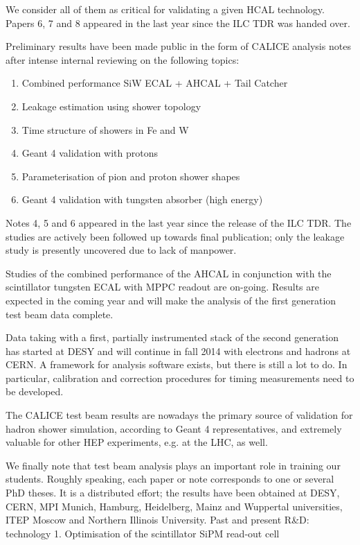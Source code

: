 We consider all of them as critical for validating a given HCAL technology. Papers 6, 7 and 8 appeared in the last year since the ILC TDR was handed over.

Preliminary results have been made public in the form of CALICE analysis notes after intense internal reviewing on the following topics:
\begin{enumerate}
\item Combined performance SiW ECAL + AHCAL + Tail Catcher
\item Leakage estimation using shower topology
\item Time structure of showers in Fe and W
\item Geant 4 validation with protons
\item Parameterisation of pion and proton shower shapes
\item Geant 4 validation with tungsten absorber (high energy)
\end{enumerate}

Notes 4, 5 and 6 appeared in the last year since the release of the ILC TDR. The studies are actively been followed up towards final publication; only the leakage study is presently uncovered due to lack of manpower.

Studies of the combined performance of the AHCAL in conjunction with the scintillator tungsten ECAL with MPPC readout are on-going. Results are expected in the coming year and will make the analysis of the first generation test beam data complete.

Data taking with a first, partially instrumented stack of the second generation has started at DESY and will continue in fall 2014 with electrons and hadrons at CERN. A framework for analysis software exists, but there is still a lot to do. In particular, calibration and correction procedures for timing measurements need to be developed.

The CALICE test beam results are nowadays the primary source of validation for hadron shower simulation, according to Geant 4 representatives, and extremely valuable for other HEP experiments, e.g. at the LHC, as well.

We finally note that test beam analysis plays an important role in training our students. Roughly speaking, each paper or note corresponds to one or several PhD theses. It is a distributed effort; the results have been obtained at DESY, CERN, MPI Munich, Hamburg, Heidelberg, Mainz and Wuppertal universities, ITEP Moscow and Northern Illinois University.
Past and present R\&D: technology
1.  Optimisation of the scintillator SiPM read-out cell


